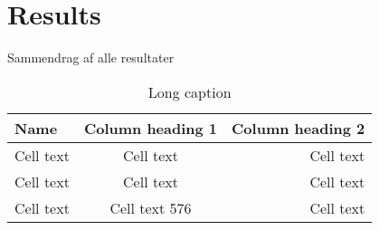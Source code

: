 \graphicspath{{Chapters/Project/}}

\section{Results} %
\label{sec:results}

Sammendrag af alle resultater

\vspace{3 mm} %
\begin{table}[H]
\centering
\sffamily
\small
\begin{tabular}{l | c r}
\toprule
Name 			& Column heading 1 		& Column heading 2	\\
\midrule 
Cell text 	& Cell text					& Cell text			\\ 
Cell text 	& Cell text 				& Cell text 		\\ 
Cell text 	& Cell text 576				& Cell text			\\ 
\bottomrule 
\end{tabular}
\caption[Short caption]{Long caption}
\label{table:table lable}
\end{table}

